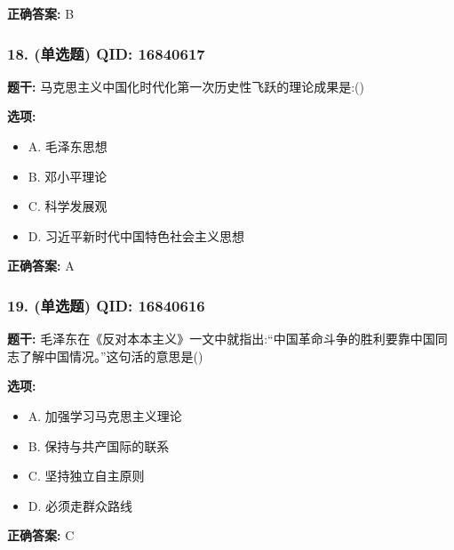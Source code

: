 \documentclass[12pt,UTF8]{ctexart}
\begin{document}
\textbf{正确答案:}
B

\vspace{0.3em}\hrulefill\vspace{0.7em}

\subsubsection*{18. (单选题) \small QID: 16840617}

\textbf{题干:}
马克思主义中国化时代化第一次历史性飞跃的理论成果是:()

\textbf{选项:}
\begin{itemize}[leftmargin=*]

  \item A. 毛泽东思想

  \item B. 邓小平理论

  \item C. 科学发展观

  \item D. 习近平新时代中国特色社会主义思想

\end{itemize}

\textbf{正确答案:}
A

\vspace{0.3em}\hrulefill\vspace{0.7em}

\subsubsection*{19. (单选题) \small QID: 16840616}

\textbf{题干:}
毛泽东在《反对本本主义》一文中就指出:“中国革命斗争的胜利要靠中国同志了解中国情况。”这句活的意思是()

\textbf{选项:}
\begin{itemize}[leftmargin=*]

  \item A. 加强学习马克思主义理论

  \item B. 保持与共产国际的联系

  \item C. 坚持独立自主原则

  \item D. 必须走群众路线

\end{itemize}

\textbf{正确答案:}
C

\vspace{0.3em}\hrulefill\vspace{0.7em}
\end{document}
